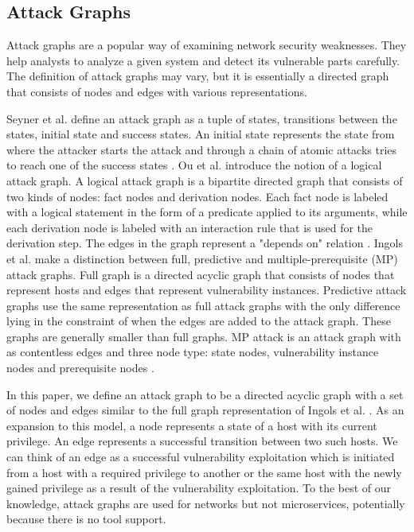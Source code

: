 \subsection{Attack Graphs}
\label{chap:attack_graphs}

Attack graphs \cite{sheyner2002automated} are a popular way of examining network security weaknesses. They help analysts to analyze a given system and detect its vulnerable parts carefully.  The definition of attack graphs may vary, but it is essentially a directed graph that consists of nodes and edges with various representations.

Seyner et al. define an attack graph as a tuple of states, transitions between the states, initial state and success states. An initial state represents the state from where the attacker starts the attack and through a chain of atomic attacks tries to reach one of the success states \cite{sheyner2002automated}. Ou et al. introduce the notion of a logical attack graph. A logical attack graph is a bipartite directed graph that consists of two kinds of nodes: fact nodes and derivation nodes. Each fact node is labeled with a logical statement in the form of a predicate applied to its arguments, while each derivation node is labeled with an interaction rule that is used for the derivation step. The edges in the graph represent a "depends on" relation \cite{ou2006scalable}. Ingols et al. make a distinction between full, predictive and multiple-prerequisite (MP) attack graphs. Full graph is a directed acyclic graph that consists of nodes that represent hosts and edges that represent vulnerability instances. Predictive attack graphs use the same representation as full attack graphs with the only difference lying in the constraint of when the edges are added to the attack graph. These graphs are generally smaller than full graphs. MP attack is an attack graph with as contentless edges and three node type: state nodes, vulnerability instance nodes and prerequisite nodes \cite{ingols2006practical}.

In this paper, we define an attack graph to be a directed acyclic graph with a set of nodes and edges similar to the full graph representation of Ingols et al. \cite{ingols2006practical}. As an expansion to this model, a node represents a state of a host with its current privilege. An edge represents a successful transition between two such hosts. We can think of an edge as a successful vulnerability exploitation which is initiated from a host with a required privilege to another or the same host with the newly gained privilege as a result of the vulnerability exploitation. To the best of our knowledge, attack graphs are used for networks but not microservices, potentially because there is no tool support. 